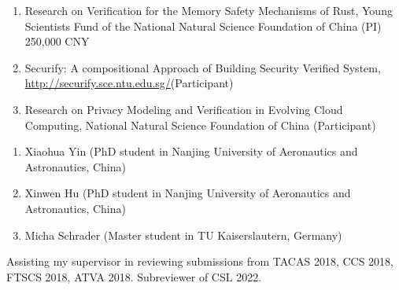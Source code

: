 \documentclass[a4paper,10pt]{memoir} %
\begin{document}




\begin{enumerate}
	\item Research on Verification for the Memory Safety Mechanisms of Rust, Young Scientists Fund of the National Natural Science Foundation of China (PI) 250,000 CNY
	\item Securify: A compositional Approach of Building Security Verified System, \url{http://securify.sce.ntu.edu.sg/}(Participant)
	\item Research on Privacy Modeling and Verification in Evolving Cloud Computing, National Natural Science Foundation of China (Participant)
\end{enumerate}

\Sep


\begin{enumerate}
	\item Xiaohua Yin (PhD student in Nanjing University of Aeronautics and Astronautics, China)
	\item Xinwen Hu (PhD student in Nanjing University of Aeronautics and Astronautics, China)
	\item Micha Schrader (Master student in TU Kaiserslautern, Germany)
\end{enumerate}

\Sep


Assisting my supervisor in reviewing submissions from TACAS 2018, CCS 2018, FTSCS 2018, ATVA 2018.
Subreviewer of CSL 2022.

\Sep

\Sep %
\end{document}
